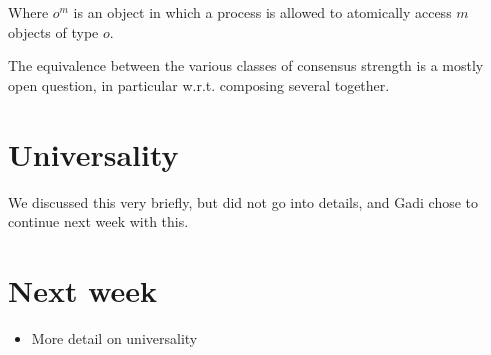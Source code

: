 \documentclass{idc_msc}
\begin{document}
Where $o^m$ is an object in which a process is allowed to atomically access $m$ objects of type $o$.

The equivalence between the various classes of consensus strength is a mostly open question, in particular w.r.t. composing several together.

\section{Universality}

We discussed this very briefly, but did not go into details, and Gadi chose to continue next week with this.

\section{Next week}

\begin{itemize}
  \item More detail on universality
\end{itemize}
\end{document}
